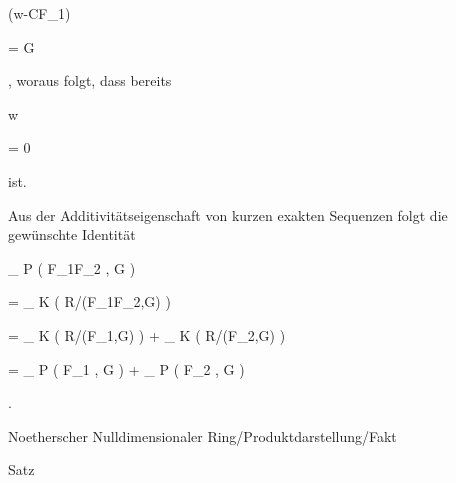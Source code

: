 {\mavergleichskette

{\vergleichskette

{ (w-CF_1)
}

{ = }{ G
}

{  }{
}

{    }{
}

{   }{
}

}
{}{}{,}
woraus folgt, dass bereits


\mavergleichskette

{\vergleichskette

{ w
}

{ = }{ 0
}

{  }{
}

{    }{
}

{   }{
}

}
{}{}{}
ist.


Aus der Additivitätseigenschaft von kurzen exakten Sequenzen folgt die ge\-wünschte Identität


\mavergleichskettealignhandlinks

{\vergleichskettealignhandlinks

{  _{ { P} }  (   F_1F_2 ,  G  )
}

{ =} { \dim_{ K } \left(   R/(F_1F_2,G)  \right)
}

{ =} { \dim_{ K } \left(   R/(F_1,G)  \right) + \dim_{ K } \left(   R/(F_2,G)  \right)
}

{ =} {  _{ { P} }  (   F_1 ,  G  ) +  _{ { P} }  (   F_2 ,  G  )
}

{ } {}

}
{}
{}{.}


}



{Noetherscher Nulldimensionaler Ring/Produktdarstellung/Fakt}

{Satz}

{}

{


\faktsituation {}



\faktzusatz {}

\faktzusatz {}


}


